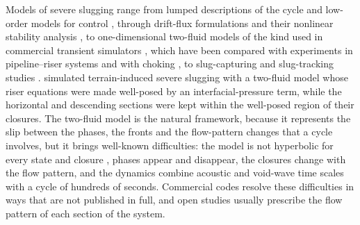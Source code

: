 \documentclass[a4paper,fleqn]{cas-sc}
\begin{document}
Models of severe slugging range from lumped descriptions of the cycle \citep{taitel1990a,sarica1991} and low-order models for control \citep{storkaas2007,jahanshahi2011}, through drift-flux formulations and their nonlinear stability analysis \citep{balino2010,azevedo2023}, to one-dimensional two-fluid models of the kind used in commercial transient simulators \citep{bendiksen1991,pauchon1994,masella1998}, which have been compared with experiments in pipeline--riser systems and with choking \citep{malekzadeh2012,park2014,li2022}, to slug-capturing and slug-tracking studies \citep{issa2003,bonizzi2009,kjeldby2013,smith2016}. \citet{han2015} simulated terrain-induced severe slugging with a two-fluid model whose riser equations were made well-posed by an interfacial-pressure term, while the horizontal and descending sections were kept within the well-posed region of their closures. The two-fluid model is the natural framework, because it represents the slip between the phases, the fronts and the flow-pattern changes that a cycle involves, but it brings well-known difficulties: the model is not hyperbolic for every state and closure \citep{stuhmiller1977,ramshaw1978,lopezdebertodano2017}, phases appear and disappear, the closures change with the flow pattern, and the dynamics combine acoustic and void-wave time scales with a cycle of hundreds of seconds. Commercial codes resolve these difficulties in ways that are not published in full, and open studies usually prescribe the flow pattern of each section of the system.
\end{document}
